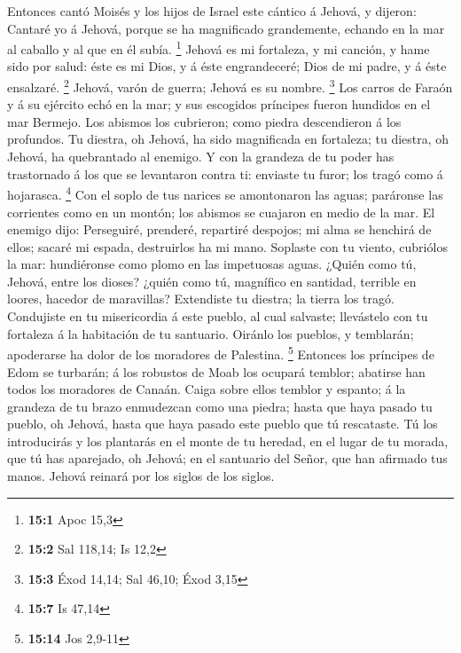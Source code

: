  Entonces cantó Moisés y los hijos de Israel este cántico
á Jehová, y dijeron: Cantaré yo á Jehová, porque se ha magnificado
grandemente, echando en la mar al caballo y al que en él subía.
\footnote{\textbf{15:1} Apoc 15,3}  Jehová es mi
fortaleza, y mi canción, y hame sido por salud: éste es mi Dios, y á
éste engrandeceré; Dios de mi padre, y á éste ensalzaré. \footnote{\textbf{15:2}
  Sal 118,14; Is 12,2}  Jehová, varón de guerra; Jehová es
su nombre. \footnote{\textbf{15:3} Éxod 14,14; Sal 46,10; Éxod 3,15}
 Los carros de Faraón y á su ejército echó en la mar; y
sus escogidos príncipes fueron hundidos en el mar Bermejo.
 Los abismos los cubrieron; como piedra descendieron á los
profundos.  Tu diestra, oh Jehová, ha sido magnificada en
fortaleza; tu diestra, oh Jehová, ha quebrantado al enemigo.
 Y con la grandeza de tu poder has trastornado á los que
se levantaron contra ti: enviaste tu furor; los tragó como á hojarasca.
\footnote{\textbf{15:7} Is 47,14}  Con el soplo de tus
narices se amontonaron las aguas; paráronse las corrientes como en un
montón; los abismos se cuajaron en medio de la mar.  El
enemigo dijo: Perseguiré, prenderé, repartiré despojos; mi alma se
henchirá de ellos; sacaré mi espada, destruirlos ha mi mano.
 Soplaste con tu viento, cubriólos la mar: hundiéronse
como plomo en las impetuosas aguas.  ¿Quién como tú,
Jehová, entre los dioses? ¿quién como tú, magnífico en santidad,
terrible en loores, hacedor de maravillas?  Extendiste tu
diestra; la tierra los tragó.  Condujiste en tu
misericordia á este pueblo, al cual salvaste; llevástelo con tu
fortaleza á la habitación de tu santuario.  Oiránlo los
pueblos, y temblarán; apoderarse ha dolor de los moradores de Palestina.
\footnote{\textbf{15:14} Jos 2,9-11}  Entonces los
príncipes de Edom se turbarán; á los robustos de Moab los ocupará
temblor; abatirse han todos los moradores de Canaán. 
Caiga sobre ellos temblor y espanto; á la grandeza de tu brazo
enmudezcan como una piedra; hasta que haya pasado tu pueblo, oh Jehová,
hasta que haya pasado este pueblo que tú rescataste.  Tú
los introducirás y los plantarás en el monte de tu heredad, en el lugar
de tu morada, que tú has aparejado, oh Jehová; en el santuario del
Señor, que han afirmado tus manos.  Jehová reinará por
los siglos de los siglos.


